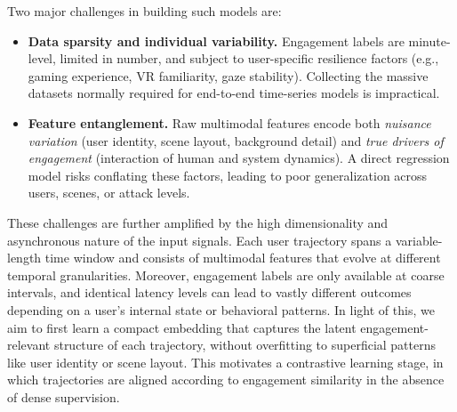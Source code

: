 \documentclass[review]{vgtc}                 %
\begin{document}
Two major challenges in building such models are:
\begin{itemize}
    \item \textbf{Data sparsity and individual variability.} Engagement labels are minute-level, limited in number, and subject to user-specific resilience factors (e.g., gaming experience, VR familiarity, gaze stability). Collecting the massive datasets normally required for end-to-end time-series models is impractical.
    
    \item \textbf{Feature entanglement.} Raw multimodal features encode both \emph{nuisance variation} (user identity, scene layout, background detail) and \emph{true drivers of engagement} (interaction of human and system dynamics). A direct regression model risks conflating these factors, leading to poor generalization across users, scenes, or attack levels.
\end{itemize}
These challenges are further amplified by the high dimensionality and asynchronous nature of the input signals. Each user trajectory spans a variable-length time window and consists of multimodal features that evolve at different temporal granularities. Moreover, engagement labels are only available at coarse intervals, and identical latency levels can lead to vastly different outcomes depending on a user's internal state or behavioral patterns. In light of this, we aim to first learn a compact embedding that captures the latent engagement-relevant structure of each trajectory, without overfitting to superficial patterns like user identity or scene layout. This motivates a contrastive learning stage, in which trajectories are aligned according to engagement similarity in the absence of dense supervision.
\end{document}

